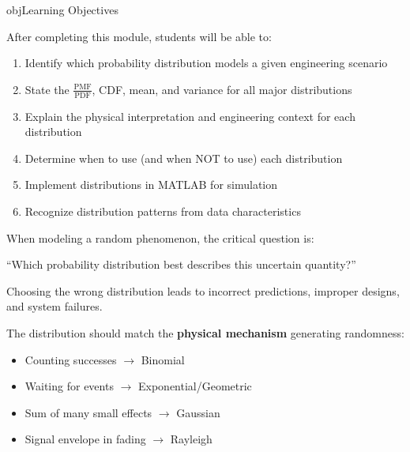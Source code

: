 \begin{PSbox}[unbreakable]{obj}{Learning Objectives}

After completing this module, students will be able to:

\begin{enumerate}
\def\labelenumi{\arabic{enumi}.}
\tightlist
\item
  Identify which probability distribution models a given engineering scenario
\item
  State the $\frac{\mathrm{PMF}}{\mathrm{PDF}}$, CDF, mean, and variance for all major distributions
\item
  Explain the physical interpretation and engineering context for each distribution
\item
  Determine when to use (and when NOT to use) each distribution
\item
  Implement distributions in MATLAB for simulation
\item
  Recognize distribution patterns from data characteristics
\end{enumerate}

\end{PSbox}



When modeling a random phenomenon, the critical question is:

\begin{PSquote}

``Which probability distribution best describes this uncertain quantity?''

\end{PSquote}

Choosing the wrong distribution leads to incorrect predictions, improper designs, and system failures.


The distribution should match the \textbf{physical mechanism} generating randomness:

\begin{itemize}
\tightlist
\item
  Counting successes \ensuremath{\to} Binomial
\item
  Waiting for events \ensuremath{\to} Exponential/Geometric
\item
  Sum of many small effects \ensuremath{\to} Gaussian
\item
  Signal envelope in fading \ensuremath{\to} Rayleigh
\end{itemize}

